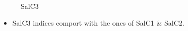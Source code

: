 \documentclass{article}
\begin{document}
{\begin{landscape}
                    \begin{figure}[h]
                        \centering
                        \qquad
                        \caption{SalC3}%
                        \label{fig:example}
                    \end{figure}
                    \vspace*{2\baselineskip}
                    
                    \begin{itemize}
                       \item SalC3 indices comport with the ones of SalC1 & SalC2.


\end{itemize}
\end{landscape}}
\end{document}
